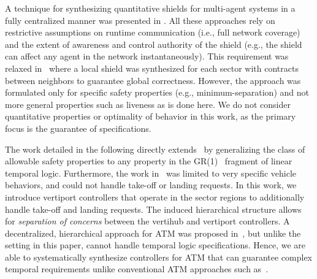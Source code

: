 A technique for synthesizing quantitative shields for multi-agent systems in a fully centralized manner was presented in \cite{multiagentshield}. All these approaches rely on restrictive assumptions on runtime communication (i.e., full network coverage) and the extent of awareness and control authority of the shield (e.g., the shield can affect any agent in the network instantaneously). This requirement was relaxed in~\cite{bhnfm} where a local shield was synthesized for each sector with contracts between neighbors to guarantee global correctness. However, the approach was formulated only for specific safety properties (e.g., minimum-separation) and not more general properties such as liveness as is done here. We do not consider quantitative properties or optimality of behavior in this work, as the primary focus is the guarantee of specifications.

The work detailed in the following directly extends~\cite{bhnfm} by generalizing the class of allowable safety properties to any property in the GR(1)~\cite{bloem2012synthesis} fragment of linear temporal logic. Furthermore, the work in~\cite{bhnfm} was limited to very specific vehicle behaviors, and could not handle take-off or landing requests. In this work, we introduce vertiport controllers that operate in the sector regions to additionally handle take-off and landing requests. The induced hierarchical structure allows for \emph{separation of concerns} between the vertihub and vertiport controllers. A decentralized, hierarchical approach for ATM was proposed in~\cite{6011668}, but unlike the setting in this paper, cannot handle temporal logic specifications. Hence, we are able to systematically synthesize controllers for ATM that can guarantee complex temporal requirements unlike conventional ATM approaches such as~\cite{6011668}. 
